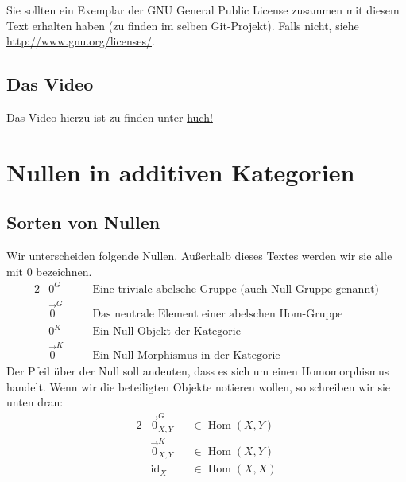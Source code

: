 \documentclass[a4paper]{amsart}
\theoremstyle{definition}
\DeclareMathOperator{\id}{id}
\DeclareMathOperator{\Hom}{Hom}
\begin{document}
Sie sollten ein Exemplar der GNU General Public License zusammen mit diesem Text erhalten haben 
(zu finden im selben Git-Projekt). 
Falls nicht, siehe \url{http://www.gnu.org/licenses/}.

\subsection*{Das Video}
Das Video hierzu ist zu finden unter 
{\tiny
   \url{huch!}
}

\section{Nullen in additiven Kategorien}

\subsection{Sorten von Nullen}
Wir unterscheiden folgende Nullen. Außerhalb dieses Textes werden wir sie alle mit $0$ bezeichnen.
\begin{alignat}{2}
   &0^G         &&\quad \text{Eine triviale abelsche Gruppe (auch Null-Gruppe genannt)}\\
   &\vec 0^G    &&\quad \text{Das neutrale Element einer abelschen Hom-Gruppe}\\
   &0^K         &&\quad \text{Ein Null-Objekt der Kategorie}\\
   &\vec0^K   &&\quad \text{Ein Null-Morphismus in der Kategorie}
\end{alignat}
Der Pfeil über der Null soll andeuten, dass es sich um einen Homomorphismus handelt.
Wenn wir die beteiligten Objekte notieren wollen, so schreiben wir sie unten dran:
\begin{alignat}{2}
   &\vec 0^G_{X,Y}      &&\in \Hom( X,Y)\\
   &\vec 0^K_{X,Y}      &&\in \Hom( X,Y)\\
   &\id_X                &&\in \Hom( X,X)
\end{alignat}
\end{document}
